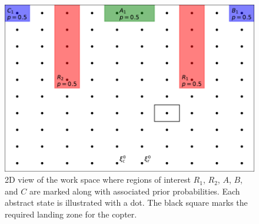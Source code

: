 \documentclass[conference]{IEEEtran}
\begin{document}
\begin{figure}
  \begin{center}
    \includegraphics[width=0.6\columnwidth]{2figs/arena.pdf}
  \end{center}
  \caption{2D view of the work space where regions of interest $R_1$, $R_2$, $A$, $B$, and $C$ are marked along with associated prior probabilities. Each abstract state is illustrated with a dot. The black square marks the required landing zone for the copter.}
  \label{fig:workspace1}
\end{figure}

\end{document}
